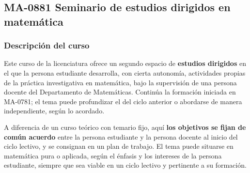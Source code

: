 \newpage
\subsection*{MA-0881 Seminario de estudios dirigidos en matemática}

\hypertarget{MA0881}{}
\begin{refsection}
\begin{table}[H]
\end{table}

\subsubsection*{Descripción del curso}

Este curso de la licenciatura ofrece un segundo espacio de \textbf{estudios dirigidos} en el que la persona estudiante desarrolla, con cierta autonomía, actividades propias de la práctica investigativa en matemática, bajo la supervisión de una persona docente del Departamento de Matemáticas. Continúa la formación iniciada en MA-0781; el tema puede profundizar el del ciclo anterior o abordarse de manera independiente, según lo acordado.

A diferencia de un curso teórico con temario fijo, aquí \textbf{los objetivos se fijan de común acuerdo} entre la persona estudiante y la persona docente al inicio del ciclo lectivo, y se consignan en un plan de trabajo. El tema puede situarse en matemática pura o aplicada, según el énfasis y los intereses de la persona estudiante, siempre que sea viable en un ciclo lectivo y pertinente a su formación.


\end{refsection}
